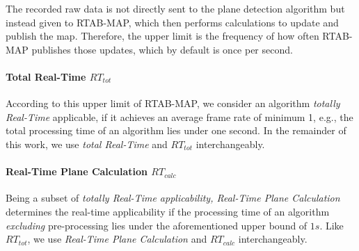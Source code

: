 \documentclass[main.tex]{subfiles}
\begin{document}
The recorded raw data is not directly sent to the plane detection algorithm but instead given to RTAB-MAP, which then performs
calculations to update and publish the map.
Therefore, the upper limit is the frequency of how often RTAB-MAP publishes those updates, which by default is once per second.

\paragraph{Total Real-Time $RT_{tot}$}
According to this upper limit of RTAB-MAP, we consider an algorithm \textit{totally Real-Time} applicable, if it achieves an average frame
rate of minimum 1, e.g., the total processing time of an algorithm lies under one second. In the remainder of this work, we
use \textit{total Real-Time} and $RT_{tot}$ interchangeably.

\paragraph{Real-Time Plane Calculation $RT_{calc}$}
Being a subset of \textit{totally Real-Time applicability, Real-Time Plane Calculation} determines the real-time applicability if the processing time of an algorithm
\textit{excluding} pre-processing lies under the aforementioned upper bound of $1s$. Like $RT_{tot}$, we use
\textit{Real-Time Plane Calculation} and $RT_{calc}$ interchangeably.

\end{document}
